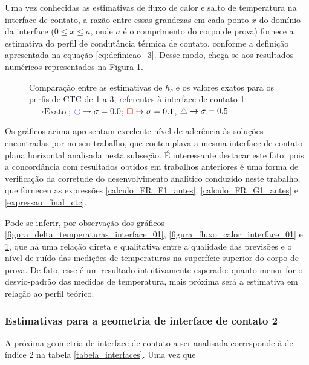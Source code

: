 Uma vez conhecidas as estimativas de fluxo de calor e salto de temperatura na interface de contato, a razão entre essas grandezas em cada ponto $x$ do domínio da interface ($0 \le x \le a$, onde $a$ é o comprimento do corpo de prova) fornece a estimativa do perfil de condutância térmica de contato, conforme a definição apresentada na equação \eqref{eq:definicao_3}. Desse modo, chega-se aos resultados numéricos representados na Figura \ref{figura_ctc_interface_01}.
\begin{figure}[h!b]
	\caption{Comparação entre as estimativas de $h_c$ e os valores exatos para os perfis de CTC de 1 a 3, referentes à interface de contato 1: $\text{--} \rightarrow \text{Exato}$; $\textcolor{blue}{\ocircle} \rightarrow \sigma = 0.0$; $\textcolor{red}{\square} \rightarrow \sigma = 0.1$, $\textcolor{gray}{\triangle} \rightarrow \sigma = 0.5$}
	\label{figura_ctc_interface_01}
\end{figure}

Os gráficos acima apresentam excelente nível de aderência às soluções encontradas por \cite{tese_padilha} no seu trabalho, que contemplava a mesma interface de contato plana horizontal analisada nesta subseção. É interessante destacar este fato, pois a concordância com resultados obtidos em trabalhos anteriores é uma forma de verificação da corretude do desenvolvimento analítico conduzido neste trabalho, que forneceu as expressões \eqref{calculo_FR_F1_antes}, \eqref{calculo_FR_G1_antes} e \eqref{expressao_final_ctc}.

Pode-se inferir, por observação dos gráficos \ref{figura_delta_temperaturas_interface_01}, \ref{figura_fluxo_calor_interface_01} e \ref{figura_ctc_interface_01}, que há uma relação direta e qualitativa entre a qualidade das previsões e o nível de ruído das medições de temperaturas na superfície superior do corpo de prova. De fato, esse é um resultado intuitivamente esperado: quanto menor for o desvio-padrão das medidas de temperatura, mais próxima será a estimativa em relação ao perfil teórico.

\subsubsection{Estimativas para a geometria de interface de contato 2}

A próxima geometria de interface de contato a ser analisada corresponde à de índice 2 na tabela \ref{tabela_interfaces}. Uma vez que 

